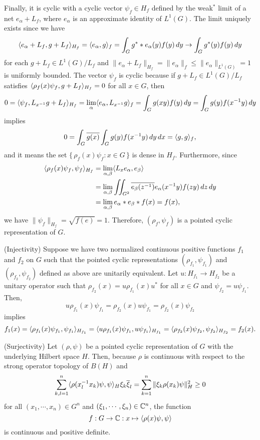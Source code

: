 \documentclass{../../small}
\begin{document}
\begin{pf}
Finally, it is cyclic with a cyclic vector $\psi_f\in H_f$ defined by the weak$^*$ limit of a net $e_\alpha+L_f$, where $e_\alpha$ is an approximate identity of $L^1(G)$.
The limit uniquely exists since we have
\[\langle e_\alpha+L_f,g+L_f\rangle_{H_f}=\langle e_\alpha,g\rangle_f=\int_Gg^**e_\alpha(y)f(y)\,dy\to\int_Gg^*(y)f(y)\,dy\]
for each $g+L_f\in L^1(G)/L_f$ and $\|e_\alpha+L_f\|_{H_f}=\|e_\alpha\|_f\le\|e_\alpha\|_{L^1(G)}=1$ is uniformly bounded.
The vector $\psi_f$ is cyclic because if $g+L_f\in L^1(G)/L_f$ satisfies $\langle\rho_f(x)\psi_f,g+L_f\rangle_{H_f}=0$ for all $x\in G$, then
\[0=\langle\psi_f,L_{x^{-1}}g+L_f\rangle_{H_f}=\lim_\alpha\langle e_\alpha,L_{x^{-1}}g\rangle_f=\int_Gg(xy)f(y)\,dy=\int_Gg(y)f(x^{-1}y)\,dy\]
implies
\[0=\int_G\overline{g(x)}\int_Gg(y)f(x^{-1}y)\,dy\,dx=\langle g,g\rangle_f,\]
and it means the set $\{\,\rho_f(x)\psi_f:x\in G\,\}$ is dense in $H_f$.
Furthermore, since
\begin{align*}
\langle\rho_f(x)\psi_f,\psi_f\rangle_{H_f}&=\lim_{\alpha,\beta}\langle L_xe_\alpha,e_\beta\rangle\\
&=\lim_{\alpha,\beta}\iint_{G^2}\overline{e_\beta(z^{-1})}e_\alpha(x^{-1}y)f(zy)\,dz\,dy\\
&=\lim_{\alpha,\beta}e_\alpha*e_\beta*f(x)=f(x),\end{align*}
we have $\|\psi_f\|_{H_f}=\sqrt{f(e)}=1$.
Therefore, $(\rho_f,\psi_f)$ is a pointed cyclic representation of $G$.

(Injectivity)
Suppose we have two normalized continuous positive functions $f_1$ and $f_2$ on $G$ such that the pointed cyclic representations $(\rho_{f_1},\psi_{f_1})$ and $(\rho_{f_2},\psi_{f_2})$ defined as above are unitarily equivalent.
Let $u:H_{f_1}\to H_{f_2}$ be a unitary operator such that $\rho_{f_2}(x)=u\rho_{f_1}(x)u^*$ for all $x\in G$ and $\psi_{f_2}=u\psi_{f_1}$.
Then,
\[u\rho_{f_1}(x)\psi_{f_1}=\rho_{f_2}(x)u\psi_{f_1}=\rho_{f_2}(x)\psi_{f_2}\]
implies
\[f_1(x)=\langle\rho_{f_1}(x)\psi_{f_1},\psi_{f_1}\rangle_{H_{f_1}}=\langle u\rho_{f_1}(x)\psi_{f_1},u\psi_{f_1}\rangle_{H_{f_1}}=\langle\rho_{f_2}(x)\psi_{f_2},\psi_{f_2}\rangle_{H_{f_2}}=f_2(x).\]

(Surjectivity)
Let $(\rho,\psi)$ be a pointed cyclic representation of $G$ with the underlying Hilbert space $H$.
Then, because $\rho$ is continuous with respect to the strong operator topology of $B(H)$ and
\[\sum_{k,l=1}^n\langle\rho(x_l^{-1}x_k)\psi,\psi\rangle_H\xi_k\overline\xi_l=\sum_{k=1}^n\|\xi_k\rho(x_k)\psi\|_H^2\ge0\]
for all $(x_1,\cdots,x_n)\in G^n$ and $(\xi_1,\cdots,\xi_n)\in\mathbb{C}^n$, the function
\[f:G\to\mathbb{C}:x\mapsto\langle\rho(x)\psi,\psi\rangle\]
is continuous and positive definite.


\end{pf}
\end{document}
